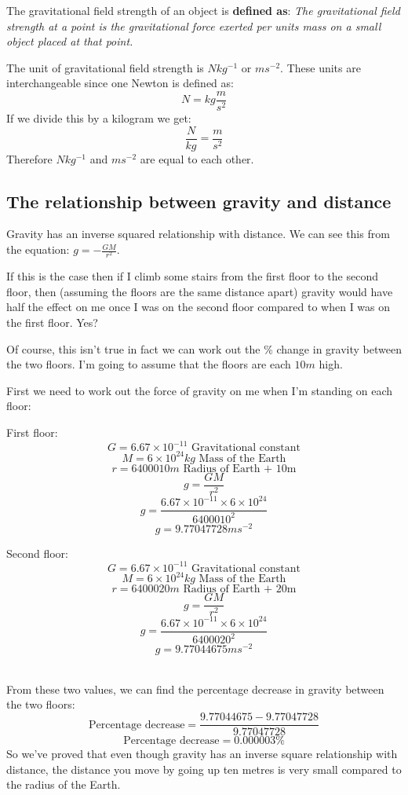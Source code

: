 \documentclass{article}
\begin{document}
The gravitational field strength of an object is \textbf{defined as}: \textit{The gravitational field strength at a point is the gravitational force exerted per units mass on a small object placed at that point.}

The unit of gravitational field strength is $Nkg^{-1}$ or $ms^{-2}$. These units are interchangeable since one Newton is defined as:
\[
	N = kg \frac{m}{s^2}
\] 
If we divide this by a kilogram we get:
\[
	\frac{N}{kg} = \frac{m}{s^2}
\]
Therefore $Nkg^{-1}$ and $ms^{-2}$ are equal to each other.


\subsection*{The relationship between gravity and distance}
Gravity has an inverse squared relationship with distance. We can see this from the equation: $g = -\frac{GM}{r^2}$. 

If this is the case then if I climb some stairs from the first floor to the second floor, then (assuming the floors are the same distance apart) gravity would have half the effect on me once I was on the second floor compared to when I was on the first floor. Yes?

Of course, this isn't true in fact we can work out the \% change in gravity between the two floors. I'm going to assume that the floors are each $10m$ high.

First we need to work out the force of gravity on me when I'm standing on each floor:

\begin{minipage}[t]{0.5\textwidth}
First floor:
\[
	G = 6.67 \times 10^{-11} \textrm{ Gravitational constant}
\]
\[
	M = 6 \times 10^{24}kg \textrm{ Mass of the Earth}
\]
\[
	r = 6400010m \textrm{ Radius of Earth + 10m}
\]
\[
	g = \frac{GM}{r^2}
\]
\[
	g = \frac{6.67 \times 10^{-11} \times 6 × 10^{24}}{6400010^2}
\]
\[
	g = 9.77047728ms^{-2}
\]
\end{minipage}
\begin{minipage}[t]{0.5\textwidth}
Second floor:
\[
	G = 6.67 \times 10^{-11} \textrm{ Gravitational constant}
\]
\[
	M = 6 \times 10^{24}kg \textrm{ Mass of the Earth}
\]
\[
	r = 6400020m \textrm{ Radius of Earth + 20m}
\]
\[
	g = \frac{GM}{r^2}
\]
\[
	g = \frac{6.67 \times 10^{-11} \times 6 \times 10^{24}}{6400020^2}
\]
\[
	g = 9.77044675ms^{-2}
\]
\end{minipage}\\

From these two values, we can find the percentage decrease in gravity between the two floors:
\[
	\textrm{Percentage decrease} = \frac{9.77044675 - 9.77047728}{9.77047728}
\]
\[
	\textrm{Percentage decrease} = 0.000003 \%
\]
So we've proved that even though gravity has an inverse square relationship with distance, the distance you move by going up ten metres is very small compared to the radius of the Earth.
\end{document}
